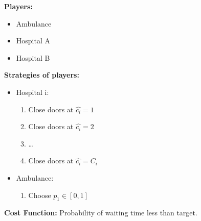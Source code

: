 \noindent 
{\Large\textbf{Players:}}
\begin{itemize}
    \item Ambulance
    \item Hospital A
    \item Hospital B
\end{itemize}

\noindent 
{\Large\textbf{Strategies of players:}}
\begin{itemize}
    \item Hospital i:    
    \begin{enumerate} 
        \item Close doors at \(\hat{c_i} = 1\) 
        \item Close doors at \(\hat{c_i} = 2\)
        \item \dots
        \item Close doors at \(\hat{c_i} = C_i\)
    \end{enumerate}
    \item Ambulance:
    \begin{enumerate}
        \item Choose \(p_1 \in [0,1]\) 
    \end{enumerate}
\end{itemize}

\noindent 
{\Large\textbf{Cost Function:}} Probability of waiting time less than target. 




